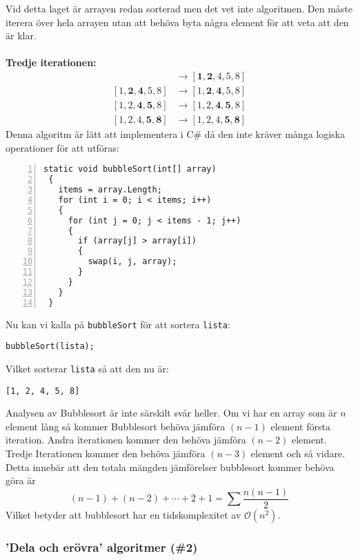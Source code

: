 \documentclass[a4]{article}
\begin{document}
Vid detta laget är arrayen redan sorterad men det vet inte algoritmen. Den måste iterera över hela arrayen utan att behöva byta några element för att veta att den är klar.\\\\
\textbf{Tredje iterationen:}
\begin{align*}
    [\textbf{1}, \textbf{2}, 4, 5, 8] &\rightarrow [\textbf{1}, \textbf{2}, 4, 5, 8]\\
    [1, \textbf{2}, \textbf{4}, 5, 8] &\rightarrow [1, \textbf{2}, \textbf{4}, 5, 8]\\
    [1, 2, \textbf{4}, \textbf{5}, 8] &\rightarrow [1, 2, \textbf{4}, \textbf{5}, 8]\\
    [1, 2, 4, \textbf{5}, \textbf{8}] &\rightarrow [1, 2, 4, \textbf{5}, \textbf{8}]
\end{align*}
Denna algoritm är lätt att implementera i C\# då den inte kräver många logiska operationer för att utföras:
\begin{lstlisting}[style=mystyle, numbers=left]
 static void bubbleSort(int[] array)
 {
   items = array.Length;
   for (int i = 0; i < items; i++)
   {
     for (int j = 0; j < items - 1; j++)
     {
       if (array[j] > array[i])
       {
         swap(i, j, array);
       }
     }
   }
 }
\end{lstlisting}
Nu kan vi kalla på \lstinline{bubbleSort} för att sortera \lstinline{lista}:
\begin{lstlisting}[style=mystyle, numbers=none]
 bubbleSort(lista);
\end{lstlisting}
Vilket sorterar \lstinline{lista} så att den nu är:
\begin{lstlisting}[style=mystyle, numbers=none]
 [1, 2, 4, 5, 8]
\end{lstlisting} 
Analysen av  Bubblesort är inte särskilt svår heller. Om vi har en array som är $n$ element lång så kommer Bubblesort behöva jämföra $(n-1)$ element första iteration. Andra iterationen kommer den behöva jämföra $(n-2)$ element. Tredje Iterationen kommer den behöva jämföra $(n-3)$ element och så vidare. Detta innebär att den totala mängden jämförelser  bubblesort kommer behöva göra är
\begin{equation*}
    (n-1) + (n-2) + \cdots + 2 + 1 = \sum\frac{n(n-1)}{2}
\end{equation*}
Vilket betyder att bubblesort har en tidskomplexitet av $\mathcal{O}(n^2)$.

\subsubsection{'Dela och erövra' algoritmer (\#2)}
\end{document}
